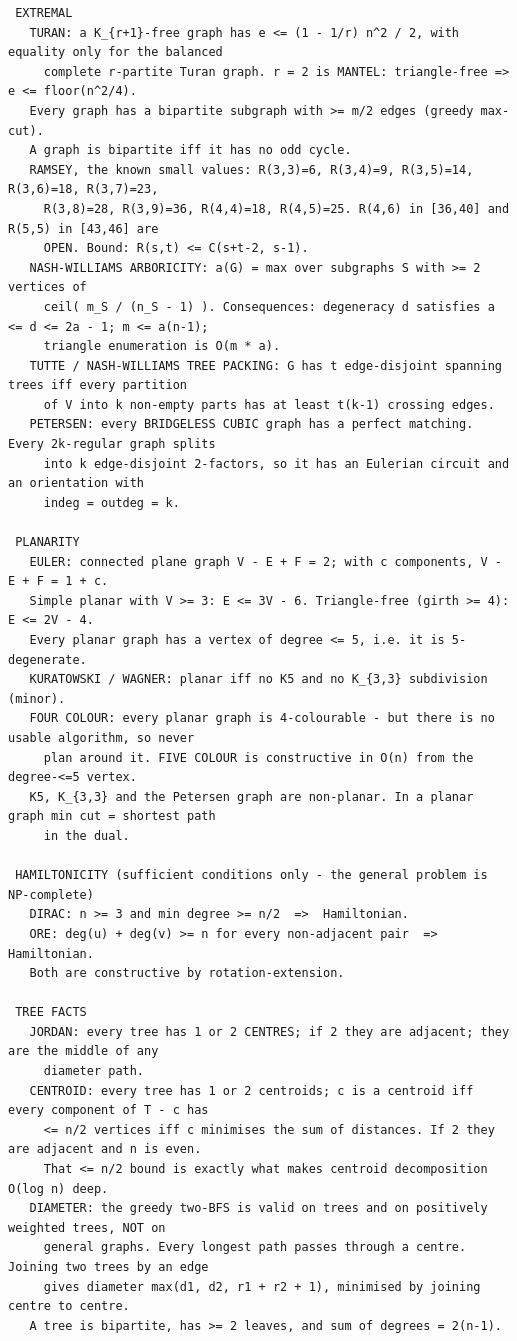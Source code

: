 \documentclass[9pt,a4paper,twocolumn]{extarticle}
\begin{document}
\begin{lstlisting}
 EXTREMAL
   TURAN: a K_{r+1}-free graph has e <= (1 - 1/r) n^2 / 2, with equality only for the balanced
     complete r-partite Turan graph. r = 2 is MANTEL: triangle-free => e <= floor(n^2/4).
   Every graph has a bipartite subgraph with >= m/2 edges (greedy max-cut).
   A graph is bipartite iff it has no odd cycle.
   RAMSEY, the known small values: R(3,3)=6, R(3,4)=9, R(3,5)=14, R(3,6)=18, R(3,7)=23,
     R(3,8)=28, R(3,9)=36, R(4,4)=18, R(4,5)=25. R(4,6) in [36,40] and R(5,5) in [43,46] are
     OPEN. Bound: R(s,t) <= C(s+t-2, s-1).
   NASH-WILLIAMS ARBORICITY: a(G) = max over subgraphs S with >= 2 vertices of
     ceil( m_S / (n_S - 1) ). Consequences: degeneracy d satisfies a <= d <= 2a - 1; m <= a(n-1);
     triangle enumeration is O(m * a).
   TUTTE / NASH-WILLIAMS TREE PACKING: G has t edge-disjoint spanning trees iff every partition
     of V into k non-empty parts has at least t(k-1) crossing edges.
   PETERSEN: every BRIDGELESS CUBIC graph has a perfect matching. Every 2k-regular graph splits
     into k edge-disjoint 2-factors, so it has an Eulerian circuit and an orientation with
     indeg = outdeg = k.

 PLANARITY
   EULER: connected plane graph V - E + F = 2; with c components, V - E + F = 1 + c.
   Simple planar with V >= 3: E <= 3V - 6. Triangle-free (girth >= 4): E <= 2V - 4.
   Every planar graph has a vertex of degree <= 5, i.e. it is 5-degenerate.
   KURATOWSKI / WAGNER: planar iff no K5 and no K_{3,3} subdivision (minor).
   FOUR COLOUR: every planar graph is 4-colourable - but there is no usable algorithm, so never
     plan around it. FIVE COLOUR is constructive in O(n) from the degree-<=5 vertex.
   K5, K_{3,3} and the Petersen graph are non-planar. In a planar graph min cut = shortest path
     in the dual.

 HAMILTONICITY (sufficient conditions only - the general problem is NP-complete)
   DIRAC: n >= 3 and min degree >= n/2  =>  Hamiltonian.
   ORE: deg(u) + deg(v) >= n for every non-adjacent pair  =>  Hamiltonian.
   Both are constructive by rotation-extension.

 TREE FACTS
   JORDAN: every tree has 1 or 2 CENTRES; if 2 they are adjacent; they are the middle of any
     diameter path.
   CENTROID: every tree has 1 or 2 centroids; c is a centroid iff every component of T - c has
     <= n/2 vertices iff c minimises the sum of distances. If 2 they are adjacent and n is even.
     That <= n/2 bound is exactly what makes centroid decomposition O(log n) deep.
   DIAMETER: the greedy two-BFS is valid on trees and on positively weighted trees, NOT on
     general graphs. Every longest path passes through a centre. Joining two trees by an edge
     gives diameter max(d1, d2, r1 + r2 + 1), minimised by joining centre to centre.
   A tree is bipartite, has >= 2 leaves, and sum of degrees = 2(n-1).


\end{lstlisting}
\end{document}
